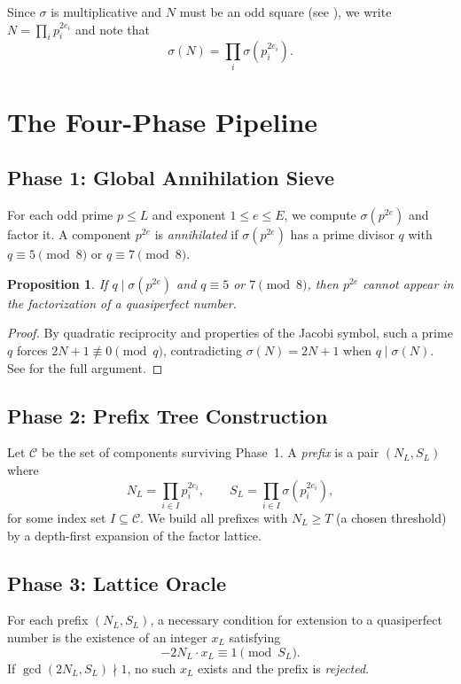 \documentclass[12pt]{article}
\newtheorem{proposition}[theorem]{Proposition}
\begin{document}
Since $\sigma$ is multiplicative and $N$ must be an odd square (see \cite{CohenHagis1982}),
we write $N = \prod_i p_i^{2e_i}$ and note that
\[
    \sigma(N) = \prod_i \sigma(p_i^{2e_i}).
\]

\section{The Four-Phase Pipeline}

\subsection{Phase 1: Global Annihilation Sieve}

For each odd prime $p \leq L$ and exponent $1 \leq e \leq E$, we compute
$\sigma(p^{2e})$ and factor it. A component $p^{2e}$ is \emph{annihilated} if
$\sigma(p^{2e})$ has a prime divisor $q$ with $q \equiv 5 \pmod{8}$ or
$q \equiv 7 \pmod{8}$.

\begin{proposition}
If $q \mid \sigma(p^{2e})$ and $q \equiv 5$ or $7 \pmod{8}$, then $p^{2e}$
cannot appear in the factorization of a quasiperfect number.
\end{proposition}

\begin{proof}
By quadratic reciprocity and properties of the Jacobi symbol, such a prime
$q$ forces $2N+1 \not\equiv 0 \pmod{q}$, contradicting $\sigma(N) = 2N+1$
when $q \mid \sigma(N)$. See \cite{CohenHagis1982} for the full argument.
\end{proof}

\subsection{Phase 2: Prefix Tree Construction}

Let $\mathcal{C}$ be the set of components surviving Phase~1. A \emph{prefix}
is a pair $(N_L, S_L)$ where
\[
    N_L = \prod_{i \in I} p_i^{2e_i}, \qquad
    S_L = \prod_{i \in I} \sigma(p_i^{2e_i}),
\]
for some index set $I \subseteq \mathcal{C}$. We build all prefixes with
$N_L \geq T$ (a chosen threshold) by a depth-first expansion of the
factor lattice.

\subsection{Phase 3: Lattice Oracle}

For each prefix $(N_L, S_L)$, a necessary condition for extension to a
quasiperfect number is the existence of an integer $x_L$ satisfying
\[
    -2 N_L \cdot x_L \equiv 1 \pmod{S_L}.
\]
If $\gcd(2N_L, S_L) \nmid 1$, no such $x_L$ exists and the prefix is
\emph{rejected}.
\end{document}
